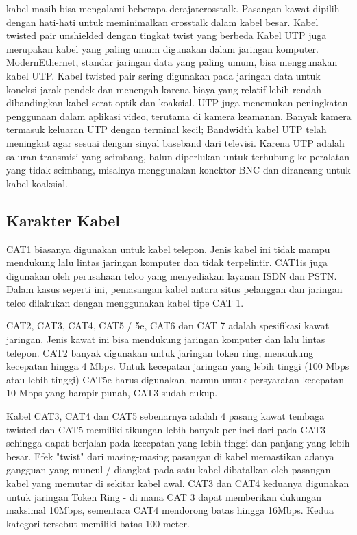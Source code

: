 kabel masih bisa mengalami beberapa derajatcrosstalk. Pasangan kawat dipilih dengan hati-hati untuk meminimalkan crosstalk dalam kabel besar. Kabel 
twisted pair unshielded dengan tingkat twist yang berbeda Kabel UTP juga merupakan kabel yang paling umum digunakan dalam jaringan komputer. ModernEthernet, 
standar jaringan data yang paling umum, bisa menggunakan kabel UTP. Kabel twisted pair sering digunakan pada jaringan data untuk koneksi jarak pendek dan 
menengah karena biaya yang relatif lebih rendah dibandingkan kabel serat optik dan koaksial. UTP juga menemukan peningkatan penggunaan dalam aplikasi video, 
terutama di kamera keamanan. Banyak kamera termasuk keluaran UTP dengan terminal kecil; Bandwidth kabel UTP telah meningkat agar sesuai dengan sinyal baseband 
dari televisi. Karena UTP adalah saluran transmisi yang seimbang, balun diperlukan untuk terhubung ke peralatan yang tidak seimbang, misalnya menggunakan 
konektor BNC dan dirancang untuk kabel koaksial.

\subsection {Karakter Kabel}
CAT1 biasanya digunakan untuk kabel telepon. Jenis kabel ini tidak mampu mendukung lalu lintas jaringan komputer dan tidak terpelintir. CAT1is juga digunakan 
oleh perusahaan telco yang menyediakan layanan ISDN dan PSTN. Dalam kasus seperti ini, pemasangan kabel antara situs pelanggan dan jaringan telco dilakukan 
dengan menggunakan kabel tipe CAT 1.

CAT2, CAT3, CAT4, CAT5 / 5e, CAT6 dan CAT 7 adalah spesifikasi kawat jaringan. Jenis kawat ini bisa mendukung jaringan komputer dan lalu lintas telepon. CAT2 
banyak digunakan untuk jaringan token ring, mendukung kecepatan hingga 4 Mbps. Untuk kecepatan jaringan yang lebih tinggi (100 Mbps atau lebih tinggi) CAT5e 
harus digunakan, namun untuk persyaratan kecepatan 10 Mbps yang hampir punah, CAT3 sudah cukup.

Kabel CAT3, CAT4 dan CAT5 sebenarnya adalah 4 pasang kawat tembaga twisted dan CAT5 memiliki tikungan lebih banyak per inci dari pada CAT3 sehingga dapat 
berjalan pada kecepatan yang lebih tinggi dan panjang yang lebih besar. Efek "twist" dari masing-masing pasangan di kabel memastikan adanya gangguan yang 
muncul / diangkat pada satu kabel dibatalkan oleh pasangan kabel yang memutar di sekitar kabel awal. CAT3 dan CAT4 keduanya digunakan untuk jaringan Token 
Ring - di mana CAT 3 dapat memberikan dukungan maksimal 10Mbps, sementara CAT4 mendorong batas hingga 16Mbps. Kedua kategori tersebut memiliki batas 100 meter.

